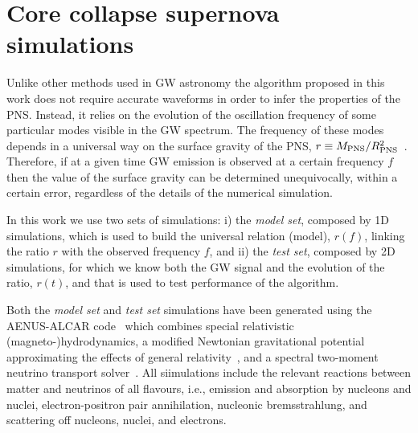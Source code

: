 \section{Core collapse supernova simulations}
\label{sec:simulations}

Unlike other methods used in GW astronomy the algorithm proposed in {this work} does not require accurate
waveforms {in order to infer the properties of the PNS.} Instead, it relies on the evolution of the oscillation
frequency of some particular modes visible in the GW spectrum.
The frequency of these modes depends in a universal way on the surface gravity of the PNS, $r\equiv M_{\rm PNS}/R_{\rm PNS}^2$~\citep{Torres:2019b}. Therefore, if at a given time GW emission is observed at a certain
frequency $f$ then the value of the surface gravity can be determined unequivocally, within a certain error,
regardless of the details of the numerical simulation. 

In this work we use two sets of simulations: i) the {\it model set}, composed by 1D simulations, which is used to build the 
universal relation (model), $r(f)$, linking the ratio $r$ with the observed frequency $f$, and ii) the {\it test set}, composed by
2D simulations, 
for which we know both the GW signal and the evolution of the ratio, $r (t)$, and that is used to test
performance of the algorithm.

Both the {\it model set} and {\it test set} simulations have been generated using the AENUS-ALCAR code~\citep{Just:2015}
which combines special relativistic (magneto-)hydrodynamics, a modified Newtonian gravitational potential approximating the effects of general relativity~\citep{Marek_etal__2006__AA__TOV-potential}, and a spectral
two-moment neutrino transport solver~\citep{Just:2015}.
All siimulations include the relevant reactions between matter and neutrinos of all
flavours, i.e., emission and absorption by nucleons and nuclei,
electron-positron pair annihilation, nucleonic bremsstrahlung, and
scattering off nucleons, nuclei, and electrons.


